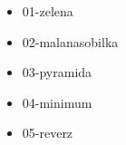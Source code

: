 



\begin{itemize}
\item 01-zelena
\item 02-malanasobilka
\item 03-pyramida
\item 04-minimum
\item 05-reverz
\end{itemize}

